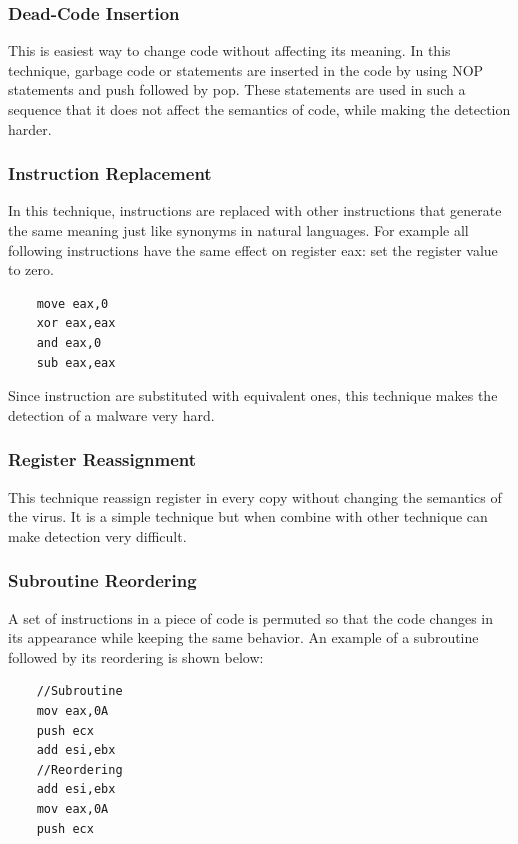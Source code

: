 \subsubsection{Dead-Code Insertion}
This is easiest way to change code without affecting its meaning. In this technique, garbage code or statements are inserted in the code by using NOP statements and push followed by pop. These statements are used in such a sequence that it does not affect the semantics of code, while making the detection harder. 

\subsubsection{Instruction Replacement}
In this technique, instructions are replaced with other instructions that generate the same meaning just like synonyms in natural languages. For example all following instructions have the same effect on register eax: set the register value to zero.

\begin{lstlisting}
    move eax,0
    xor eax,eax
    and eax,0
    sub eax,eax
\end{lstlisting}

\noindent Since instruction are substituted with equivalent ones, this technique makes the detection of a malware very hard.

\subsubsection{Register Reassignment}
This technique reassign register in every copy without changing the semantics of the virus. It is a simple technique but when combine with other technique can make detection very difficult.

\subsubsection{Subroutine Reordering}
A set of instructions in a piece of code is permuted so that the code changes in its appearance while keeping the same behavior. An example of a subroutine followed by its reordering is shown below:

\begin{lstlisting}
    //Subroutine
    mov eax,0A
    push ecx
    add esi,ebx
    //Reordering
    add esi,ebx
    mov eax,0A
    push ecx
\end{lstlisting}

